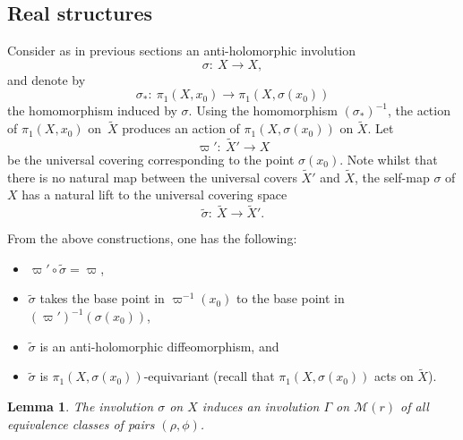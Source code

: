\documentclass[pdftex]{sigma}
\numberwithin{equation}{section}
\newtheorem{Lemma}[Theorem]{Lemma}
\begin{document}
\subsection{Real structures} Consider as in previous sections an anti-holomorphic involution
\[
\sigma\colon\ X \longrightarrow X,
\]
and denote by
\begin{equation}\label{o0}
\sigma_*\colon\ \pi_1(X, x_0) \longrightarrow \pi_1(X, \sigma(x_0))
\end{equation}
 the homomorphism induced by $\sigma$. Using the homomorphism $(\sigma_*)^{-1}$, the
action of $\pi_1(X, x_0)$ on~$\widetilde{X}$ produces an action of
$\pi_1(X, \sigma(x_0))$ on $\widetilde{X}$. Let
\[
\varpi'\colon\ \widetilde{X}' \longrightarrow X
\]
be the universal covering corresponding to the point $\sigma(x_0)$. Note whilst that there
is no natural map between the universal covers $\widetilde{X}'$ and $\widetilde{X}$,
the self-map $\sigma$ of $X$ has a natural lift to the universal covering space
\begin{equation}\label{o-1}
\widetilde{\sigma}\colon\ \widetilde{X} \longrightarrow \widetilde{X}'.
\end{equation}
\begin{Remark}From the above constructions, one has the following:
\begin{itemize}\itemsep=0pt
\item[(1)] $\varpi'\circ \widetilde{\sigma} = \varpi$,

\item[(2)] $\widetilde{\sigma}$ takes the base point in $\varpi^{-1}(x_0)$ to the base point
in $(\varpi')^{-1}(\sigma(x_0))$,

\item[(3)] $\widetilde{\sigma}$ is an anti-holomorphic diffeomorphism, and

\item[(4)] $\widetilde{\sigma}$ is $\pi_1(X, \sigma(x_0))$-equivariant \big(recall that
$\pi_1(X, \sigma(x_0))$ acts on $\widetilde{X}$\big).
\end{itemize}
\end{Remark}
\begin{Lemma}\label{newinvo} The involution $\sigma$ on $X$ induces an involution $\Gamma$ on ${\mathcal M}(r)$ of all equivalence
classes of pairs $(\rho, \phi)$.
\end{Lemma}
\end{document}
